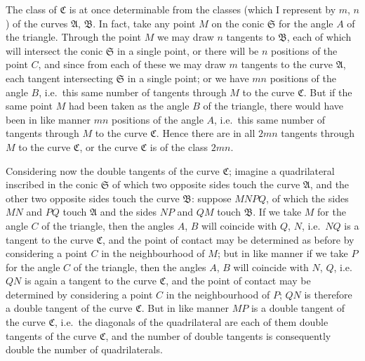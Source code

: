 \documentclass[11pt]{article}
\begin{document}
\medskip

\noindent The class of $\mathfrak{C}$ is at once determinable from the classes (which I represent by
$m$, $n$) of the curves $\mathfrak{A}$, $\mathfrak{B}$. In fact, take any point $M$ on the conic $\mathfrak{S}$ for the
angle $A$ of the triangle. Through the point $M$ we may draw $n$ tangents to $\mathfrak{B}$,
each of which will intersect the conic $\mathfrak{S}$ in a single point, or there will be $n$
positions of the point $C$, and since from each of these we may draw $m$ tangents to
the curve $\mathfrak{A}$, each tangent intersecting $\mathfrak{S}$ in a single point; or we have $mn$ positions
of the angle $B$, i.e.\ this same number of tangents through $M$ to the curve $\mathfrak{C}$. But if
the same point $M$ had been taken as the angle $B$ of the triangle, there would have
been in like manner $mn$ positions of the angle $A$, i.e.\ this same number of tangents
through $M$ to the curve $\mathfrak{C}$. Hence there are in all $2mn$ tangents through $M$ to the
curve $\mathfrak{C}$, or the curve $\mathfrak{C}$ is of the class $2mn$.

Considering now the double tangents of the curve $\mathfrak{C}$; imagine a quadrilateral
inscribed in the conic $\mathfrak{S}$ of which two opposite sides touch the curve $\mathfrak{A}$, and the
other two opposite sides touch the curve $\mathfrak{B}$: suppose $MNPQ$, of which the sides $MN$
and $PQ$ touch $\mathfrak{A}$ and the sides $NP$ and $QM$ touch $\mathfrak{B}$. If we take $M$ for the angle
$C$ of the triangle, then the angles $A$, $B$ will coincide with $Q$, $N$, i.e.\ $NQ$ is a tangent
to the curve $\mathfrak{C}$, and the point of contact may be determined as before by considering
a point $C$ in the neighbourhood of $M$; but in like manner if we take $P$ for the
angle $C$ of the triangle, then the angles $A$, $B$ will coincide with $N$, $Q$, i.e.\ $QN$ is
again a tangent to the curve $\mathfrak{C}$, and the point of contact may be determined by
considering a point $C$ in the neighbourhood of $P$; $QN$ is therefore a double tangent
of the curve $\mathfrak{C}$. But in like manner $MP$ is a double tangent of the curve $\mathfrak{C}$, i.e.\
the diagonals of the quadrilateral are each of them double tangents of the curve $\mathfrak{C}$,
and the number of double tangents is consequently double the number of quadrilaterals.
\end{document}
